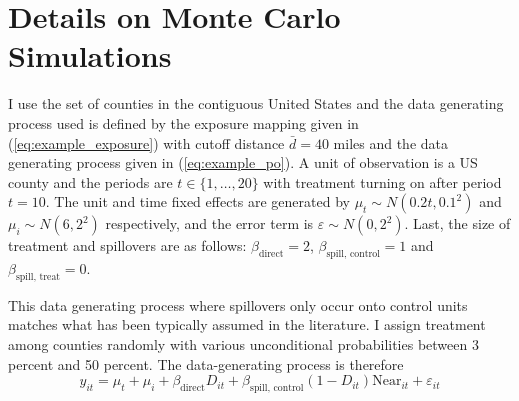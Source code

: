 \documentclass[11pt]{article}
\begin{document}
\section{Details on Monte Carlo Simulations}
\label{sec:monte_carlo}
\setcounter{figure}{0}
\setcounter{table}{0}

I use the set of counties in the contiguous United States and the data generating process used is defined by the exposure mapping given in (\ref{eq:example_exposure}) with cutoff distance $\bar{d} = 40$ miles and the data generating process given in (\ref{eq:example_po}). A unit of observation is a US county and the periods are $t \in \{1, \dots, 20\}$ with treatment turning on after period $t = 10$. The unit and time fixed effects are generated by $\mu_t \sim N(0.2t, 0.1^2)$ and $\mu_i \sim N(6, 2^2)$ respectively, and the error term is $\varepsilon \sim N(0, 2^2)$. Last, the size of treatment and spillovers are as follows: $\beta_{\text{direct}} = 2$, $\beta_{\text{spill, control}} = 1$ and $\beta_{\text{spill, treat}} = 0$.

This data generating process where spillovers only occur onto control units matches what has been typically assumed in the literature. I assign treatment among counties randomly with various unconditional probabilities between 3 percent and 50 percent. The data-generating process is therefore 
\begin{equation}
    \label{eq:dgp1} 
    y_{it} = \mu_t + \mu_i + \beta_{\text{direct}} D_{it} + \beta_{\text{spill, control}} (1-D_{it}) \text{Near}_{it} + \varepsilon_{it}   
\end{equation}
\end{document}
